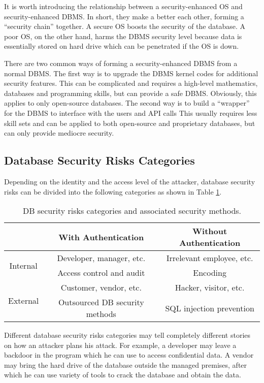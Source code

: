 \begin{shortbox}
It is worth introducing the relationship between a security-enhanced OS and security-enhanced DBMS. In short, they make a better each other, forming a ``security chain'' together. A secure OS boosts the security of the database. A poor OS, on the other hand, harms the DBMS security level because data is essentially stored on hard drive which can be penetrated if the OS is down.

There are two common ways of forming a security-enhanced DBMS from a normal DBMS. The first way is to upgrade the DBMS kernel codes for additional security features. This can be complicated and requires a high-level mathematics, databases and programming skills, but can provide a safe DBMS. Obviously, this applies to only open-source databases. The second way is to build a ``wrapper'' for the DBMS to interface with the users and API calls This usually requires less skill sets and can be applied to both open-source and proprietary databases, but can only provide mediocre security.
\end{shortbox}

\subsection{Database Security Risks Categories}

Depending on the identity and the access level of the attacker, database security risks can be divided into the following categories as shown in Table \ref{ch:securityaccessories:tab:dbsecurityriskscategories}.
\begin{table}
	\centering \caption{DB security risks categories and associated security methods.} \label{ch:securityaccessories:tab:dbsecurityriskscategories}
	\begin{tabular}{|c|c|c|}
		\hline
			& With Authentication & Without Authentication \\ \hline
		\multirow{2}{*}{Internal} & Developer, manager, etc. & Irrelevant employee, etc. \\
		& Access control and audit & Encoding \\ \hline
		\multirow{2}{*}{External} & Customer, vendor, etc. & Hacker, visitor, etc. \\
		& Outsourced DB security methods & SQL injection prevention \\
		\hline
	\end{tabular}
\end{table}
Different database security risks categories may tell completely different stories on how an attacker plans his attack. For example, a developer may leave a backdoor in the program which he can use to access confidential data. A vendor may bring the hard drive of the database outside the managed premises, after which he can use variety of tools to crack the database and obtain the data.

